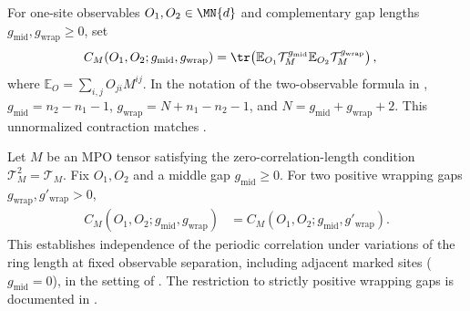 \begin{definition}
    \label{def:mpdo_periodic_two_point_correlation}
    \leanok
    For one-site observables $O_1,O_2\in\MN{d}$ and complementary gap
    lengths $g_{\mathrm{mid}},g_{\mathrm{wrap}}\geq0$, set
    \begin{align}
        C_M(O_1,O_2;g_{\mathrm{mid}},g_{\mathrm{wrap}})
         & =\tr\!\left(
        \mathbb E_{O_1}\mathcal T_M^{g_{\mathrm{mid}}}
        \mathbb E_{O_2}\mathcal T_M^{g_{\mathrm{wrap}}}\right),
        \label{eq:mpdo_periodic_correlation}
    \end{align}
    where
    $\mathbb E_O=\sum_{i,j}O_{ji}M^{ij}$.
    In the notation of the two-observable formula in
    \cite[lines~490--496]{Cirac2016MPDO_arXiv},
    $g_{\mathrm{mid}}=n_2-n_1-1$,
    $g_{\mathrm{wrap}}=N+n_1-n_2-1$, and
    $N=g_{\mathrm{mid}}+g_{\mathrm{wrap}}+2$.
    This unnormalized contraction matches \cite[lines~490--496]{Cirac2016MPDO_arXiv}.
\end{definition}

\begin{lemma}
    \label{thm:mpdo_zcl_periodic_correlation_positive_wrap_gaps_independent}
    \leanok
    Let $M$ be an MPO tensor satisfying the zero-correlation-length
    condition $\mathcal T_M^2=\mathcal T_M$. Fix $O_1,O_2$ and a middle gap $g_{\mathrm{mid}}\geq0$.
    For two positive wrapping gaps
    $g_{\mathrm{wrap}},g'_{\mathrm{wrap}}>0$,
    \begin{align}
        C_M(O_1,O_2;g_{\mathrm{mid}},g_{\mathrm{wrap}})
         & =C_M(O_1,O_2;g_{\mathrm{mid}},g'_{\mathrm{wrap}}).
        \label{eq:mpdo_zcl_correlation_positive_wrap_gap_independence}
    \end{align}
    This establishes independence of the periodic correlation under variations
    of the ring length at fixed observable separation, including adjacent
    marked sites ($g_{\mathrm{mid}}=0$), in the setting of
    \cite[Definition~4.2, lines~735--742]{Cirac2016MPDO_arXiv}. The restriction
    to strictly positive wrapping gaps is documented in
    \cite{gap:cpsv16_mpdo_zcl_correlation_length_boundary}.
\end{lemma}


